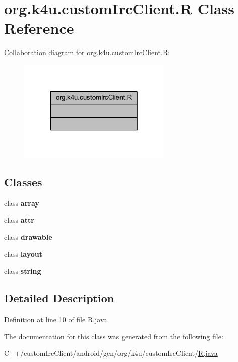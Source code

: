 \hypertarget{classorg_1_1k4u_1_1custom_irc_client_1_1_r}{\section{org.\-k4u.\-custom\-Irc\-Client.\-R Class Reference}
\label{d1/d5b/classorg_1_1k4u_1_1custom_irc_client_1_1_r}
}


Collaboration diagram for org.\-k4u.\-custom\-Irc\-Client.\-R\-:\nopagebreak
\begin{figure}[H]
\begin{center}
\leavevmode
\includegraphics[width=208pt]{de/da6/classorg_1_1k4u_1_1custom_irc_client_1_1_r__coll__graph}
\end{center}
\end{figure}
\subsection*{Classes}
\begin{DoxyCompactItemize}
\item 
class {\bfseries array}
\item 
class {\bfseries attr}
\item 
class {\bfseries drawable}
\item 
class {\bfseries layout}
\item 
class {\bfseries string}
\end{DoxyCompactItemize}


\subsection{Detailed Description}


Definition at line \hyperlink{_r_8java_source_l00010}{10} of file \hyperlink{_r_8java_source}{R.\-java}.



The documentation for this class was generated from the following file\-:\begin{DoxyCompactItemize}
\item 
C++/custom\-Irc\-Client/android/gen/org/k4u/custom\-Irc\-Client/\hyperlink{_r_8java}{R.\-java}\end{DoxyCompactItemize}
